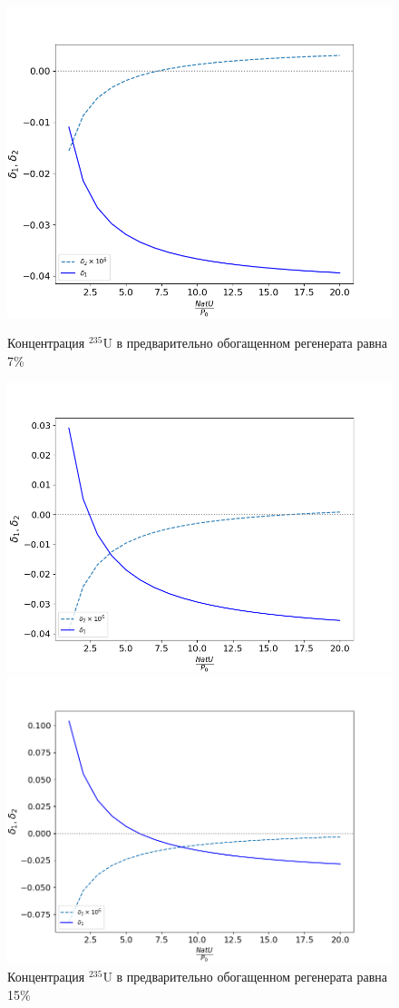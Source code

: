 \begin{figure}[ht]
  \begin{minipage}{.5\textwidth}
    \centering
    \includegraphics[width=.8\linewidth]{images/plots/7}  
    \caption{Концентрация $^{235}$U в предварительно обогащенном регенерата равна 7\%}
    \label{delta1}
  \end{minipage}
  \begin{minipage}{.5\textwidth}
    \centering
    \includegraphics[width=.8\linewidth]{images/plots/15}  
    \caption{Концентрация $^{235}$U в предварительно обогащенном регенерата равна 15\%}
    \label{delta2}
  \end{minipage}
  \begin{minipage}{.5\textwidth}
    \centering
    \includegraphics[width=.8\linewidth]{images/plots/30}  

\end{minipage}
\end{figure}
